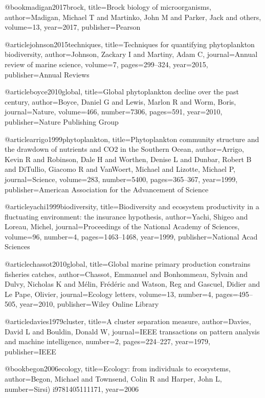 {{{{{{{{{{{{@book{madigan2017brock,
  title={Brock biology of microorganisms},
  author={Madigan, Michael T and Martinko, John M and Parker, Jack and others},
  volume={13},
  year={2017},
  publisher={Pearson}
}

@article{johnson2015techniques,
  title={Techniques for quantifying phytoplankton biodiversity},
  author={Johnson, Zackary I and Martiny, Adam C},
  journal={Annual review of marine science},
  volume={7},
  pages={299--324},
  year={2015},
  publisher={Annual Reviews}
}

@article{boyce2010global,
  title={Global phytoplankton decline over the past century},
  author={Boyce, Daniel G and Lewis, Marlon R and Worm, Boris},
  journal={Nature},
  volume={466},
  number={7306},
  pages={591},
  year={2010},
  publisher={Nature Publishing Group}
}

@article{arrigo1999phytoplankton,
  title={Phytoplankton community structure and the drawdown of nutrients and CO2 in the Southern Ocean},
  author={Arrigo, Kevin R and Robinson, Dale H and Worthen, Denise L and Dunbar, Robert B and DiTullio, Giacomo R and VanWoert, Michael and Lizotte, Michael P},
  journal={Science},
  volume={283},
  number={5400},
  pages={365--367},
  year={1999},
  publisher={American Association for the Advancement of Science}
}

@article{yachi1999biodiversity,
  title={Biodiversity and ecosystem productivity in a fluctuating environment: the insurance hypothesis},
  author={Yachi, Shigeo and Loreau, Michel},
  journal={Proceedings of the National Academy of Sciences},
  volume={96},
  number={4},
  pages={1463--1468},
  year={1999},
  publisher={National Acad Sciences}
}

@article{chassot2010global,
  title={Global marine primary production constrains fisheries catches},
  author={Chassot, Emmanuel and Bonhommeau, Sylvain and Dulvy, Nicholas K and M{\'e}lin, Fr{\'e}d{\'e}ric and Watson, Reg and Gascuel, Didier and Le Pape, Olivier},
  journal={Ecology letters},
  volume={13},
  number={4},
  pages={495--505},
  year={2010},
  publisher={Wiley Online Library}
}

@article{davies1979cluster,
  title={A cluster separation measure},
  author={Davies, David L and Bouldin, Donald W},
  journal={IEEE transactions on pattern analysis and machine intelligence},
  number={2},
  pages={224--227},
  year={1979},
  publisher={IEEE}
}


@book{begon2006ecology,
  title={Ecology: from individuals to ecosystems},
  author={Begon, Michael and Townsend, Colin R and Harper, John L},
  number={Sirsi) i9781405111171},
  year={2006}
}

}}}}}}}}}}}}
